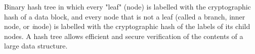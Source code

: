 Binary hash tree in which every "leaf" (node) is labelled with the cryptographic hash of a data block, and every node that is not a leaf (called a branch, inner node, or \emph{i}node) is labelled with the cryptographic hash of the labels of its child nodes. A hash tree allows efficient and secure verification of the contents of a large data structure.